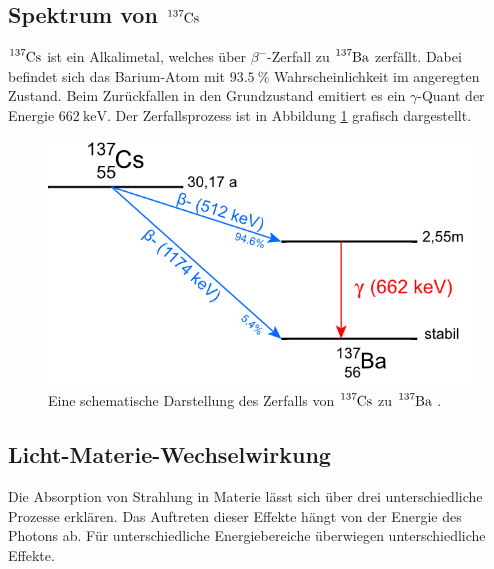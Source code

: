 \subsection{Spektrum von $\ce{^{137}Cs}$}

\noindent
$\ce{^{137}Cs}$ ist ein Alkalimetal, welches über $\beta^-$-Zerfall zu $\ce{^{137}Ba}$ zerfällt. 
Dabei befindet sich das Barium-Atom mit $\SI{93.5}{\percent}$ Wahrscheinlichkeit im angeregten Zustand. 
Beim Zurückfallen in den Grundzustand emitiert es ein $\gamma$-Quant der Energie $\SI{662}{\kilo\electronvolt}$.
Der Zerfallsprozess ist in Abbildung \ref{img:decay} grafisch dargestellt.


\begin{figure}[H]
    \centering
    \includegraphics[width=0.45 \textwidth]{latex/images/zerfall.PNG}
    \caption{Eine schematische Darstellung des Zerfalls von $\ce{^{137}Cs}$ zu $\ce{^{137}Ba}$ \protect \cite{leifi}.}
    \label{img:decay}
\end{figure}


\subsection{Licht-Materie-Wechselwirkung}

\noindent
Die Absorption von Strahlung in Materie lässt sich über drei unterschiedliche Prozesse erklären. 
Das Auftreten dieser Effekte hängt von der Energie des Photons ab. 
Für unterschiedliche Energiebereiche überwiegen unterschiedliche Effekte.

